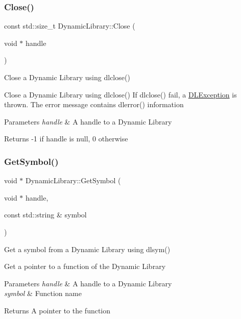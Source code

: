 \subsubsection{\texorpdfstring{Close()}{Close()}}
{\footnotesize\ttfamily const std\+::size\+\_\+t Dynamic\+Library\+::\+Close (\begin{DoxyParamCaption}\item[{void $\ast$}]{handle }\end{DoxyParamCaption})}



Close a Dynamic Library using {\ttfamily dlclose()} 

Close a Dynamic Library using {\ttfamily dlclose()} If {\ttfamily dlclose()} fail, a \hyperlink{class_d_l_exception}{D\+L\+Exception} is thrown. The error message contains {\ttfamily dlerror()} information


\begin{DoxyParams}{Parameters}
{\em handle} & A handle to a Dynamic Library\\
\hline
\end{DoxyParams}
\begin{DoxyReturn}{Returns}
-\/1 if handle is null, 0 otherwise 
\end{DoxyReturn}
\mbox{\label{class_dynamic_library_a7be5e4717bd16b25d6ddfde33941409c}} 
\subsubsection{\texorpdfstring{Get\+Symbol()}{GetSymbol()}}
{\footnotesize\ttfamily void $\ast$ Dynamic\+Library\+::\+Get\+Symbol (\begin{DoxyParamCaption}\item[{void $\ast$}]{handle,  }\item[{const std\+::string \&}]{symbol }\end{DoxyParamCaption})}



Get a symbol from a Dynamic Library using {\ttfamily dlsym()} 

Get a pointer to a function of the Dynamic Library


\begin{DoxyParams}{Parameters}
{\em handle} & A handle to a Dynamic Library \\
\hline
{\em symbol} & Function name\\
\hline
\end{DoxyParams}
\begin{DoxyReturn}{Returns}
A pointer to the function 
\end{DoxyReturn}
\mbox{\label{class_dynamic_library_afa5c94973f70976c400dd3caeafc6022}} 
